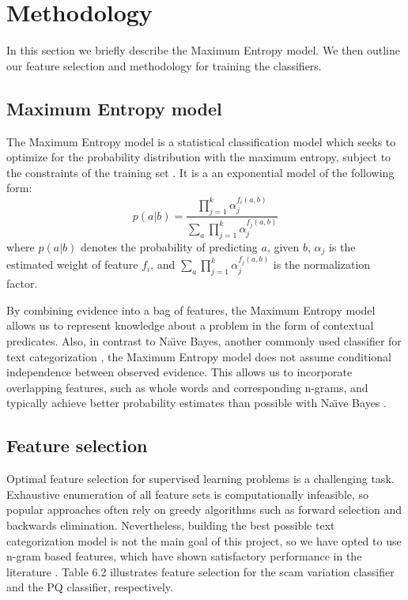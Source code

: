 \section{Methodology}
In this section we briefly describe the Maximum Entropy model. We then outline our feature selection and methodology for training the classifiers.

\subsection{Maximum Entropy model}
The Maximum Entropy model is a statistical classification model which seeks to optimize for the probability distribution with the maximum entropy, subject to the constraints of the training set . It is a an exponential model of the following form:
\begin{equation}
	p(a|b) = \frac{\prod_{j=1}^{k} \alpha_j^{f_i(a,b)}}{\sum_{a} \prod_{j=1}^{k} \alpha_j^{f_j(a,b)}}
\end{equation}
where $p(a|b)$ denotes the probability of predicting $a$, given $b$, $\alpha_{j}$ is the estimated weight of feature $f_{i}$, and $\sum_{a} \prod_{j=1}^{k} \alpha_j^{f_j(a,b)}$ is the normalization factor. 

By combining evidence into a bag of features, the Maximum Entropy model allows us to represent knowledge about a problem in the form of contextual predicates. Also, in contrast to Na\"{\i}ve Bayes, another commonly used classifier for text categorization \cite{P18}, the Maximum Entropy model does not assume conditional independence between observed evidence. This allows us to incorporate overlapping features, such as whole words and corresponding n-grams, and typically achieve better probability estimates than possible with Na\"{\i}ve Bayes \cite{P19}.

\subsection{Feature selection}
Optimal feature selection for supervised learning problems is a challenging task. Exhaustive enumeration of all feature sets is computationally infeasible, so popular approaches often rely on greedy algorithms such as forward selection and backwards elimination. Nevertheless, building the best possible text categorization model is not the main goal of this project, so we have opted to use n-gram based features, which have shown satisfactory performance in the literature \cite{P20, P21}. Table 6.2 illustrates feature selection for the scam variation classifier and the PQ classifier, respectively.

